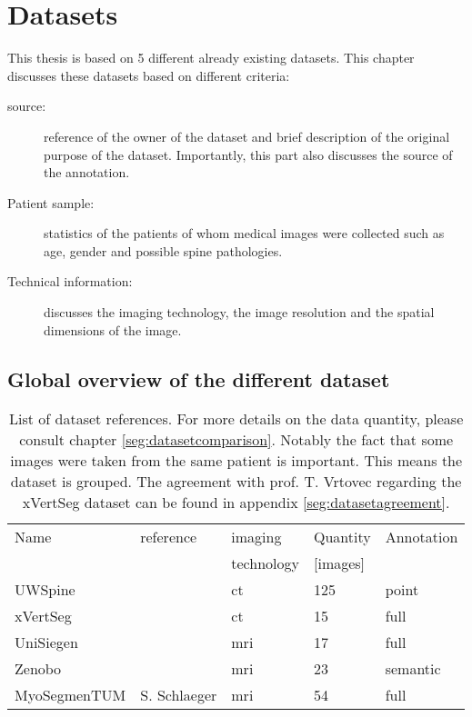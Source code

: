 \chapter{Datasets}

This thesis is based on 5 different already existing datasets.
This chapter discusses these datasets based on different criteria:

\begin{description}
    \item[source:] reference of the owner of the dataset and brief description of the original purpose of the dataset. Importantly, this part also discusses the source of the annotation.
    \item[Patient sample:] statistics of the patients of whom medical images were collected such as age, gender and possible spine pathologies.
    \item[Technical information:] discusses the imaging technology, the image resolution and the spatial dimensions of the image. 
\end{description}

\section{Global overview of the different dataset}

\begin{SCtable}[\sidecaptionrelwidth][h]
 
    \begin{tabular}{ l l l l l} 
     \hline
     \hline
     Name & reference & imaging & Quantity & Annotation \\
          &           & technology & [images] & \\
     \hline 
    UWSpine & \cite{Glocker}  & \acrshort{ct} & 125 & point  \\ 
    xVertSeg & \cite{Yoa2015} & \acrshort{ct} & 15 & full \\
    UniSiegen  &  & \acrshort{mri} & 17 & full \\
    Zenobo & & \acrshort{mri} & 23 & semantic \\
    MyoSegmenTUM & S. Schlaeger & \acrshort{mri} &  54 & full \\
     \hline
     \hline
    \end{tabular}
    \caption{List of dataset references. For more details on the data quantity, please consult chapter \ref{seg:datasetcomparison}. 
    Notably the fact that some images were taken from the same patient is important. This means the dataset is grouped. 
    The agreement with prof. T. Vrtovec regarding the xVertSeg dataset can be found in appendix \ref{seg:datasetagreement}.}

\end{SCtable}

